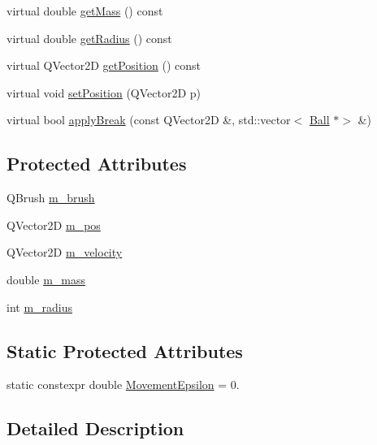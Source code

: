 \begin{DoxyCompactItemize}
virtual double \mbox{\hyperlink{class_ball_a4b8e6ae922e7c1bfe6ab4568a591580e}{get\+Mass}} () const
\item 
virtual double \mbox{\hyperlink{class_ball_a311b644cb28ee7c864806312ff52a594}{get\+Radius}} () const
\item 
virtual Q\+Vector2D \mbox{\hyperlink{class_ball_a8861d6e0221d1b4d8468458fc2ec9b3c}{get\+Position}} () const
\item 
virtual void \mbox{\hyperlink{class_ball_af656c9b3f7eb0f966f71eb100323559f}{set\+Position}} (Q\+Vector2D p)
\item 
virtual bool \mbox{\hyperlink{class_ball_a9df4c9fc8620d003cf9717d84e64d5ee}{apply\+Break}} (const Q\+Vector2D \&, std\+::vector$<$ \mbox{\hyperlink{class_ball}{Ball}} $\ast$$>$ \&)
\end{DoxyCompactItemize}
\subsection*{Protected Attributes}
\begin{DoxyCompactItemize}
\item 
Q\+Brush \mbox{\hyperlink{class_ball_a8eeb4e79fca6415f0bacb80457f4487c}{m\+\_\+brush}}
\item 
Q\+Vector2D \mbox{\hyperlink{class_ball_a50924825251df59b5715b123ac5f6395}{m\+\_\+pos}}
\item 
Q\+Vector2D \mbox{\hyperlink{class_ball_a7c207fe7385c8d519ac85e8e6c9ceae5}{m\+\_\+velocity}}
\item 
double \mbox{\hyperlink{class_ball_ac1cab784df7b44bc48d236657c28a199}{m\+\_\+mass}}
\item 
int \mbox{\hyperlink{class_ball_a5121dd03edea304520c4e9f286be67c0}{m\+\_\+radius}}
\end{DoxyCompactItemize}
\subsection*{Static Protected Attributes}
\begin{DoxyCompactItemize}
\item 
static constexpr double \mbox{\hyperlink{class_ball_a6b8169e6104a6fbcd29f81a7375bb031}{Movement\+Epsilon}} = 0.
\end{DoxyCompactItemize}


\subsection{Detailed Description}


